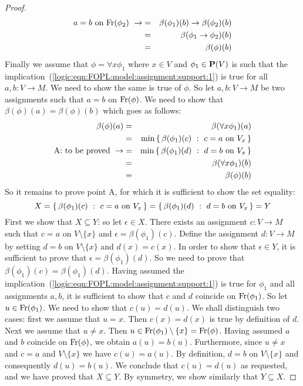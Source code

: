 \begin{proof}
\begin{eqnarray*}
    a=b\mbox{\ on\ }\mbox{\rm Fr}(\phi_{2})\ \rightarrow
    &=&\beta(\phi_{1})(b)\to\beta(\phi_{2})(b)\\
    &=&\beta(\phi_{1}\to\phi_{2})(b)\\
    &=&\beta(\phi)(b)\\
    \end{eqnarray*}
Finally we assume that $\phi=\forall x\phi_{1}$ where $x\in V$ and
$\phi_{1}\in\mbox{${\bf P}(V)$}$ is such that the
implication~(\ref{logic:eqn:FOPL:model:assignment:support:1}) is
true for all $a,b:V\to M$. We need to show the same is true of
$\phi$. So let $a,b:V\to M$ be two assignments such that $a=b$ on
$\mbox{\rm Fr}(\phi)$. We need to show that $\beta(\phi)(a)=\beta(\phi)(b)$
which goes as follows:
    \begin{eqnarray*}
    \beta(\phi)(a)&=&\beta(\forall x\phi_{1})(a)\\
    &=&\min\left\{\,\beta(\phi_{1})(c)\ :\ c=a\mbox{\ on\
    }V_{x}\,\right\}\\
    \mbox{A: to be proved}\ \rightarrow
    &=&\min\left\{\,\beta(\phi_{1})(d)\ :\ d=b\mbox{\ on\
    }V_{x}\,\right\}\\
    &=&\beta(\forall x\phi_{1})(b)\\
    &=&\beta(\phi)(b)
    \end{eqnarray*}
So it remains to prove point A, for which it is sufficient to show
the set equality:
    \[
    X=\left\{\,\beta(\phi_{1})(c)\ :\ c=a\mbox{\ on\
    }V_{x}\,\right\}=\left\{\,\beta(\phi_{1})(d)\ :\ d=b\mbox{\ on\
    }V_{x}\,\right\}=Y
    \]
First we show that $X\subseteq Y$: so let $\epsilon\in X$. There
exists an assignment $c:V\to M$ such that $c=a$ on $V\setminus\{x\}$
and $\epsilon=\beta(\phi_{1})(c)$. Define the assignment $d:V\to M$
by setting $d=b$ on $V\setminus\{x\}$ and $d(x)=c(x)$. In order to
show that $\epsilon\in Y$, it is sufficient to prove that
$\epsilon=\beta(\phi_{1})(d)$. So we need to prove that
$\beta(\phi_{1})(c)=\beta(\phi_{1})(d)$. Having assumed the
implication~(\ref{logic:eqn:FOPL:model:assignment:support:1}) is
true for $\phi_{1}$ and all assignments $a,b$, it is sufficient to
show that $c$ and $d$ coincide on $\mbox{\rm Fr}(\phi_{1})$. So let
$u\in\mbox{\rm Fr}(\phi_{1})$. We need to show that $c(u)=d(u)$. We shall
distinguish two cases: first we assume that $u=x$. Then $c(x)=d(x)$
is true by definition of $d$. Next we assume that $u\neq x$. Then
$u\in\mbox{\rm Fr}(\phi_{1})\setminus\{x\}=\mbox{\rm Fr}(\phi)$. Having assumed $a$
and $b$ coincide on $\mbox{\rm Fr}(\phi)$, we obtain $a(u)=b(u)$.
Furthermore, since $u\neq x$ and $c=a$ and $V\setminus\{x\}$ we have
$c(u)=a(u)$. By definition, $d=b$ on $V\setminus\{x\}$ and
consequently $d(u)=b(u)$. We conclude that $c(u)=d(u)$ as requested,
and we have proved that $X\subseteq Y$. By symmetry, we show
similarly that $Y\subseteq X$.
\end{proof}
